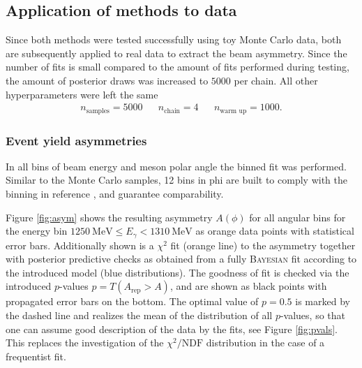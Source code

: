 \subsection{Application of methods to data}
Since both methods were tested successfully using toy Monte Carlo data, both are subsequently applied to real data to extract the beam asymmetry. Since the number of fits is small compared to the amount of fits performed during testing, the amount of posterior draws was increased to $5000$ per chain. All other hyperparameters were left the same
\begin{align}
	n_\text{samples}=5000 && n_\text{chain}=4 && n_\text{warm up}=1000.
\end{align}
\subsubsection{Event yield asymmetries}
In all bins of beam energy and meson polar angle the binned fit was performed. Similar to the Monte Carlo samples, 12 bins in phi are built to comply with the binning in reference \cite{farahphd}, and guarantee comparability.

Figure \ref{fig:asym} shows the resulting asymmetry $A(\phi)$ for all angular bins for the energy bin $\SI{1250}{\mega\eV}\leq E_\gamma<\SI{1310}{\mega\eV}$ as orange data points with statistical error bars.  Additionally shown is a $\chi^2$ fit (orange line) to the asymmetry together with posterior predictive checks as obtained from a fully \textsc{Bayesian} fit according to the introduced model (blue distributions). The goodness of fit is checked via the introduced $p$-values $p=T(A_\text{rep}>A)$, and are shown as black points with propagated error bars on the bottom. The optimal value of $p=0.5$ is marked by the dashed line and realizes the mean of the distribution of all $p$-values, so that one can assume good description of the data by the fits, see Figure \ref{fig:pvals}. This replaces the investigation of the $\chi^2/\text{NDF}$ distribution in the case of a frequentist fit.   

